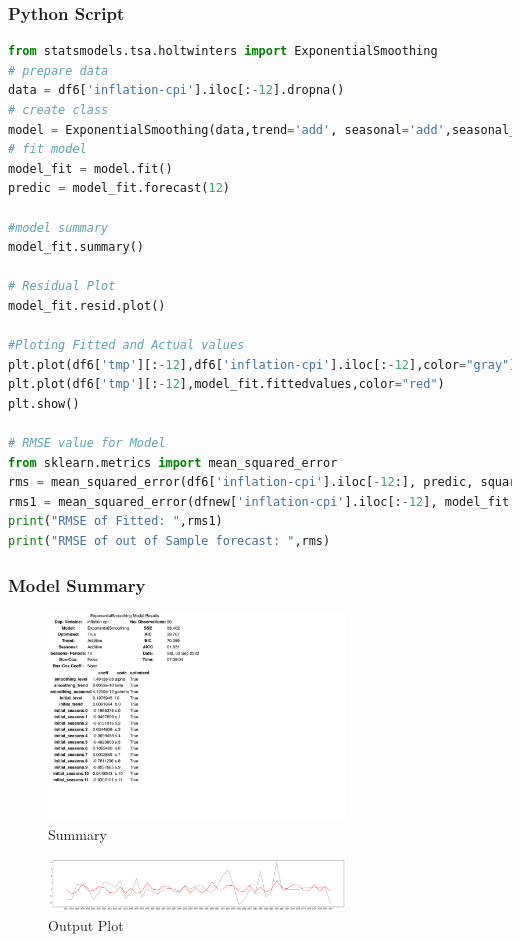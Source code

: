 \subsubsection{Python Script} 
\begin{lstlisting}[language=Python]
from statsmodels.tsa.holtwinters import ExponentialSmoothing
# prepare data
data = df6['inflation-cpi'].iloc[:-12].dropna()
# create class
model = ExponentialSmoothing(data,trend='add', seasonal='add',seasonal_periods=12)
# fit model
model_fit = model.fit()
predic = model_fit.forecast(12)

#model summary
model_fit.summary()

# Residual Plot
model_fit.resid.plot()

#Ploting Fitted and Actual values
plt.plot(df6['tmp'][:-12],df6['inflation-cpi'].iloc[:-12],color="gray")
plt.plot(df6['tmp'][:-12],model_fit.fittedvalues,color="red")
plt.show()

# RMSE value for Model
from sklearn.metrics import mean_squared_error
rms = mean_squared_error(df6['inflation-cpi'].iloc[-12:], predic, squared=False)
rms1 = mean_squared_error(dfnew['inflation-cpi'].iloc[:-12], model_fit.fittedvalues, squared=False)
print("RMSE of Fitted: ",rms1)
print("RMSE of out of Sample forecast: ",rms)

\end{lstlisting}

\subsubsection{Model Summary} 
\begin{figure}[H]
    \centering
    \includegraphics[width=0.7\textwidth]{Images/EXP.png}
    \caption{Summary}
    \label{fig1}
\end{figure}

\begin{figure}[H]
    \centering
    \includegraphics[width=0.7\textwidth]{Images/EXP_P.png}
    \caption{Output Plot}
    \label{fig1}
\end{figure}




